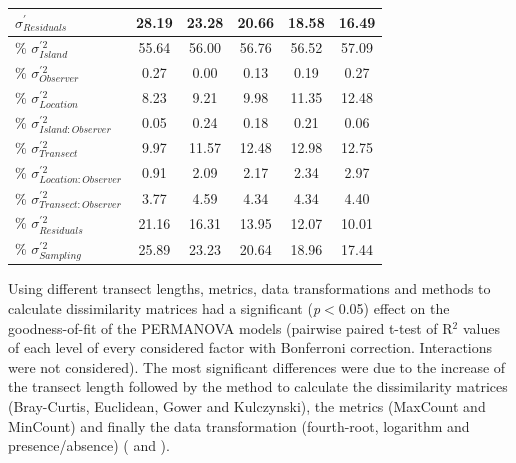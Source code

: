 \documentclass[10pt,letterpaper]{article}
\begin{document}
\begin{table}
\begin{tabular}{l|ccccc}
$\sigma^{'}_{Residuals}$          & 28.19                         & 23.28                         & 20.66                         & 18.58                         & 16.49                          \\ 
\hline
\% $\sigma^{'2}_{Island}$            & 55.64                       &    56.00                   &   56.76                     &    56.52                    &   57.09                      \\ 
\% $\sigma^{'2}_{Observer}$            &   0.27                     &     0.00                   &      0.13                  &   0.19                     &   0.27                        \\ 
\% $\sigma^{'2}_{Location}$            &  8.23                      &        9.21                &    9.98                    &   11.35                     &   12.48                     \\ 
\% $\sigma^{'2}_{Island:Observer}$     &   0.05                     &    0.24                    &    0.18                    &  0.21                      &   0.06                        \\ 
\% $\sigma^{'2}_{Transect}$          &  9.97                      &    11.57                    &    12.48                    &  12.98                      &  12.75                      \\ 
\% $\sigma^{'2}_{Location:Observer}$  &  0.91                      &      2.09                  &    2.17                    &   2.34                     &   2.97                      \\ 
\% $\sigma^{'2}_{Transect:Observer}$   &   3.77                     &     4.59                   &    4.34                    &  4.34                      &  4.40                     \\ 
\% $\sigma^{'2}_{Residuals}$          &  21.16                      &     16.31                   &   13.95                     &   12.07                     &  10.01                        \\ 
\% $\sigma^{'2}_{Sampling}$          &  25.89                      &     23.23                   &   20.64                     &   18.96                     &  17.44                        \\ 
\bottomrule
\end{tabular}
\end{table}
\renewcommand{\arraystretch}{1}

Using different transect lengths, metrics, data transformations and methods to calculate dissimilarity matrices had a significant (\textit{p}$<$0.05) effect on the goodness-of-fit of the PERMANOVA models (pairwise paired t-test of R$^{2}$ values of each level of every considered factor with Bonferroni correction. Interactions were not considered). The most significant differences were due to the increase of the transect length followed by the method to calculate the dissimilarity matrices (Bray-Curtis, Euclidean, Gower and Kulczynski), the metrics (MaxCount and MinCount) and finally the data transformation (fourth-root, logarithm and presence/absence) ( and ). 
\end{document}
